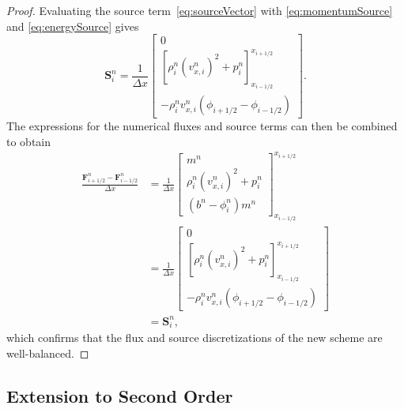 \begin{proof}
Evaluating the source term~\eqref{eq:sourceVector} with \eqref{eq:momentumSource} and \eqref{eq:energySource} gives
\begin{equation*}
\mathbf{S}_i^n=\frac{1}{\Delta x}
\begin{bmatrix}
0 \\ \left[\rho_i^n\left(v_{x,i}^n\right)^2+p_i^n\right]_{x_{i-1/2}}^{x_{i+1/2}} \\ -\rho_i^n v_{x,i}^n\left(\phi_{i+1/2}-\phi_{i-1/2}\right)
\end{bmatrix}.
\end{equation*}
The expressions for the numerical fluxes and source terms can then be combined to obtain
\begin{align*}
\frac{\mathbf{F}_{i+1/2}^n-\mathbf{F}_{i-1/2}^n}{\Delta x}&=\frac{1}{\Delta x}
\begin{bmatrix}
m^n \\ \rho_i^n\left(v_{x,i}^n\right)^2+p_i^n \\ \left(b^n-\phi_i^n\right)m^n
\end{bmatrix}_{x_{i-1/2}}^{x_{i+1/2}} \\
&=\frac{1}{\Delta x}
\begin{bmatrix}
0 \\ \left[\rho_i^n\left(v_{x,i}^n\right)^2+p_i^n\right]_{x_{i-1/2}}^{x_{i+1/2}} \\ -\rho_i^n v_{x,i}^n\left(\phi_{i+1/2}-\phi_{i-1/2}\right)
\end{bmatrix} \\
&=\mathbf{S}_i^n,
\end{align*}
which confirms that the flux and source discretizations of the new scheme are well-balanced.
\end{proof}

\subsection{Extension to Second Order}
\label{subsec:secondOrder}

